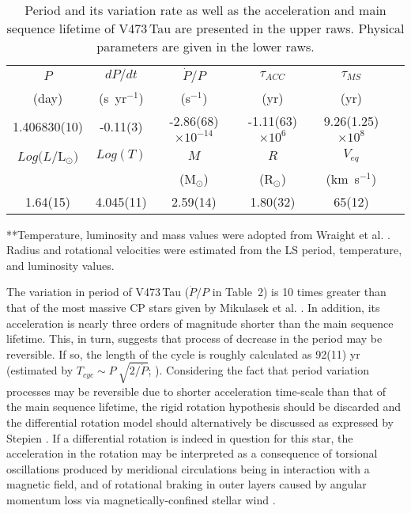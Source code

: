 \documentclass[]{article}
\begin{document}
\begin{table}
\small
\begin{center}  
\caption{Period and its variation rate as well as the acceleration and main sequence lifetime of V473\,Tau are presented in the upper raws. Physical parameters are given in the lower raws.}
\smallskip
\begin{tabular}{c c c c c c} \hline
\noalign{\smallskip}
$P$	&	$dP/dt$	&	$\dot{P}/P$	&	$\tau_{ACC}$	&	$\tau_{MS}$\\
 (day)	&	(s~yr$^{-1}$)	&	(s$^{-1}$)	&	(yr)	&	(yr)	\\
\noalign{\smallskip}
\hline
\noalign{\smallskip}

1.406830(10)	&	-0.11(3)	&	-2.86(68)$\times 10^{-14}$	&	-1.11(63)$\times 10^{6}$	&9.26(1.25)$\times 10^{8}$	\\
\noalign{\smallskip}
\hline\hline
\noalign{\smallskip}
\noalign{\smallskip}
$Log (L/$L$_{\odot})$	&	$Log (T)$	&	$M$	&	$R$	&	$V_{eq}$ \\
	&		&	(M$_{\odot}$)	&	(R$_{\odot}$)	&	(km~s$^{-1}$)	\\\hline
\noalign{\smallskip}
1.64(15)	&	4.045(11)	&	2.59(14)	&	1.80(32)	&	65(12)	\\
\hline

\end{tabular}
\end{center}
**Temperature, luminosity and mass values were adopted from Wraight et al. \protect\cite{bib14}. Radius and rotational velocities were estimated from the LS period, temperature, and luminosity values.
\label{tab:table2}
\end{table} 


The variation in period of V473\,Tau ($\dot{P}/P$ in Table~2) is 10 times greater than that of the most massive CP stars given by Mikulasek et al. \cite{bib11}. In addition, its acceleration is nearly three orders of magnitude shorter than the main sequence lifetime. This, in turn, suggests that process of decrease in the period may be reversible. If so, the length of the cycle is roughly calculated as 92(11) yr (estimated by $T_{cyc} \sim P~\sqrt{2/\dot{P}}$; \cite{bib12}). Considering the fact that period variation processes may be reversible due to shorter acceleration time-scale than that of the main sequence lifetime, the rigid rotation hypothesis should be discarded and the differential rotation model should alternatively be discussed as expressed by Stepien \cite{bib13}. If a differential rotation is indeed in question for this star, the acceleration in the rotation may be interpreted as a consequence of torsional oscillations produced by meridional circulations being in interaction with a magnetic field, and of rotational braking in outer layers caused by angular momentum loss via magnetically-confined stellar wind \cite{bib13}.
\end{document}
